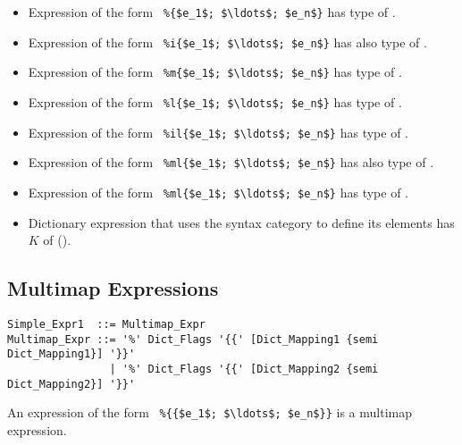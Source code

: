 \begin{itemize}
  \item Expression of the form ~\lstinline!%{$e_1$; $\ldots$; $e_n$}!
    has type of . 
  \item Expression of the form ~\lstinline!%i{$e_1$; $\ldots$; $e_n$}!
    has also type of . 
  \item Expression of the form ~\lstinline!%m{$e_1$; $\ldots$; $e_n$}!
    has type of .
  \item Expression of the form ~\lstinline!%l{$e_1$; $\ldots$; $e_n$}!
    has type of . 
  \item Expression of the form ~\lstinline!%il{$e_1$; $\ldots$; $e_n$}!
    has type of . 
  \item Expression of the form ~\lstinline!%ml{$e_1$; $\ldots$; $e_n$}!
    has also type of .
  \item Expression of the form ~\lstinline!%ml{$e_1$; $\ldots$; $e_n$}!
    has type of .
  \item Dictionary expression that uses the  syntax category to define its elements has $K$ of  (). 
\end{itemize}





\subsection{Multimap Expressions}
\label{sec:multimap-expressions}

\syntax\begin{lstlisting}
Simple_Expr1  ::= Multimap_Expr
Multimap_Expr ::= '%' Dict_Flags '{{' [Dict_Mapping1 {semi Dict_Mapping1}] '}}'
                | '%' Dict_Flags '{{' [Dict_Mapping2 {semi Dict_Mapping2}] '}}'
\end{lstlisting}

An expression of the form ~\lstinline!%{{$e_1$; $\ldots$; $e_n$}}! is a multimap expression. 

